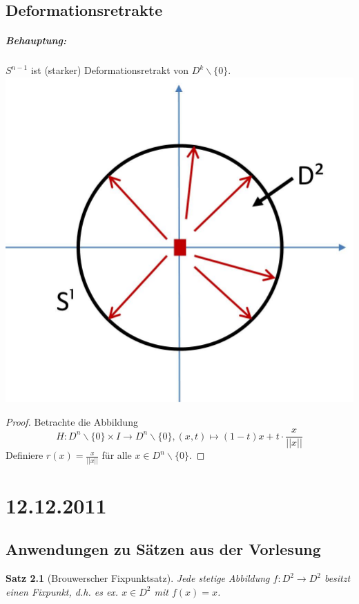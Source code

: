 \documentclass[a4paper,11pt,notitlepage]{report}
\newtheorem{theorem}{Satz}[chapter]
\begin{document}
\section{Deformationsretrakte}
\paragraph{Behauptung:} $S^{n-1}$ ist (starker) Deformationsretrakt von $D^k\backslash \{0\}$. \newline
\includegraphics[scale=0.4]{images/Deformationsretrakt_S1_D2.jpg}

\begin{proof}
	Betrachte die Abbildung $$H \colon D^n \backslash \{0\} \times I \rightarrow D^n \backslash \{0\}, (x,t) \mapsto (1-t)x + t \cdot \frac{x}{||x||}$$
	Definiere $r(x)= \frac{x}{||x||}$ für alle $x \in D^n \backslash \{0\}$.
\end{proof}

\chapter{12.12.2011}
\section{Anwendungen zu Sätzen aus der Vorlesung}
\begin{theorem}[Brouwerscher Fixpunktsatz]
	Jede stetige Abbildung $f \colon D^2 \rightarrow D^2$ besitzt einen Fixpunkt, d.h. es ex. $x \in D^2$ mit $f(x)=x$.
\end{theorem}
\end{document}

